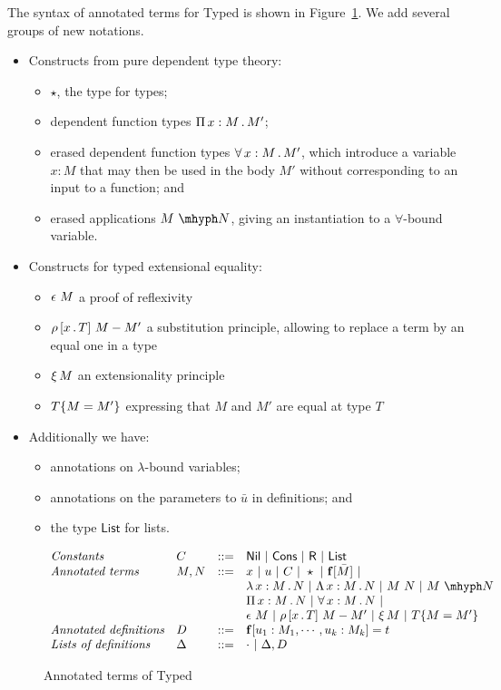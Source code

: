 \documentclass{article}
\begin{document}
The syntax of annotated terms for Typed \sar is shown in
Figure~\ref{fig:annotm}.  We add several groups of new notations.
\begin{itemize}
\item Constructs from pure dependent type theory:
  \begin{itemize}
  \item $\star$, the type for types;
  \item dependent function types $\Pia{x}{M}{M'}$;
  \item erased dependent function types $\allt{x}{M}{M'}$, which introduce a variable $x:M$ that
    may then be used in the body $M'$ without corresponding to an input to a function; and
  \item erased applications $\appe{M}{N}$, giving an instantiation to a $\forall$-bound variable.
  \end{itemize}
\item Constructs for typed extensional equality:
  \begin{itemize}
  \item $\rfl{M}$ a proof of reflexivity
  \item $\cng{x}{T}{M}{M'}$ a substitution principle, allowing to replace a term by an equal one in a type
  \item $\ext{M}$ an extensionality principle
  \item $\eqtm{M}{T}{M'}$ expressing that $M$ and $M'$ are equal at type $T$
  \end{itemize}
\item Additionally we have:
\begin{itemize}
\item annotations on $\lambda$-bound variables;
\item annotations on the parameters to $\bar{u}$ in definitions; and
\item the type $\mathsf{List}$ for lists.
\end{itemize}
\end{itemize}

\begin{figure}
  \[
  \begin{array}{llll}
    \textit{Constants} & C & ::= &  \mathsf{Nil}\ |\ \mathsf{Cons}\ |\ \mathsf{R}\ |\ \mathsf{List} \\
    \textit{Annotated terms} & M, N & ::= &
    x\ |\ u\ |\ C\ |\ \star\ |\ \mathbf{f}[\bar{M}]\ |\\
    \ &\ &\ & \tlam{x}{M}{N}\ |\ \Tlam{x}{M}{N}\ |\ M\ N\ |\ \appe{M}{N}\\
    \ &\ &\ & \Pia{x}{M}{N}\ |\ \allt{x}{M}{N}\ |\\    
    \ &\ &\ & \rfl{M}\ |\ \cng{x}{T}{M}{M'}\ |\ \ext{M}\ |\ \eqtm{M}{T}{M'} \\
    \textit{Annotated definitions} & D & ::= & \mathbf{f}[u_1:M_1,\cdots,u_k:M_k] = t \\
    \textit{Lists of definitions} & \Delta & ::= & \cdot \ |\ \Delta, D
  \end{array}
  \]
  \caption{Annotated terms of Typed \sar}
  \label{fig:annotm}
\end{figure}
\end{document}
